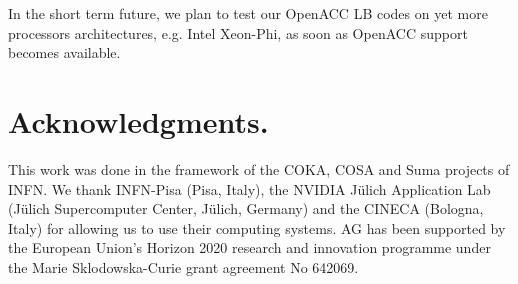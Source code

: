 \documentclass[times]{cpeauth}
\begin{document}
In the short term future, we plan to test our OpenACC LB codes on yet 
more processors architectures, e.g. Intel Xeon-Phi, as soon as OpenACC 
support becomes available. 


\section*{Acknowledgments.}

This work was done in the framework of the COKA, COSA and Suma projects of INFN.  
We thank INFN-Pisa (Pisa, Italy), the NVIDIA J\"ulich Application Lab (J\"ulich
Supercomputer Center, J\"ulich, Germany) and the CINECA (Bologna, Italy) 
for allowing us to use their computing systems.
AG has been supported by the European Union's Horizon 2020 research and
innovation programme under the Marie Sklodowska-Curie grant agreement No 642069.




%
%

\end{document}
